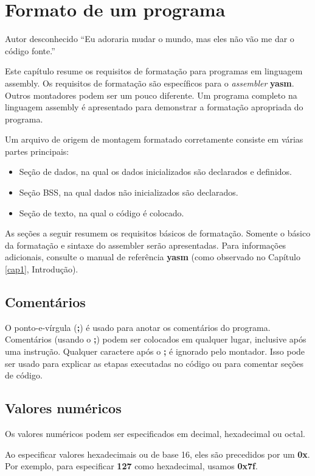 \chapter{Formato de um programa}
\label{cap4:formato}

\begin{chapquote}{Autor desconhecido}
``Eu adoraria mudar o mundo, mas eles não vão me dar o código fonte.''
\end{chapquote}
Este capítulo resume os requisitos de formatação para programas em linguagem assembly. Os requisitos de formatação são específicos para o  \textit{assembler} \textbf{yasm}. Outros montadores podem
ser um pouco diferente. Um programa completo na linguagem assembly é apresentado para demonstrar a formatação apropriada do programa.

Um arquivo de origem de montagem formatado corretamente consiste em várias partes principais:
\begin{itemize}
	\item Seção de dados, na qual os dados inicializados são declarados e definidos.
	\item Seção BSS, na qual dados não inicializados são declarados.
	\item Seção de texto, na qual o código é colocado.
\end{itemize}

As seções a seguir resumem os requisitos básicos de formatação. Somente o básico da formatação e sintaxe do assembler serão apresentadas. Para informações adicionais, consulte o
manual de referência \textbf{yasm} (como observado no Capítulo \ref{cap1}, Introdução).

\section{Comentários}
O ponto-e-vírgula (\textbf{;}) é usado para anotar os comentários do programa. Comentários (usando o \textbf{;}) podem ser
colocados em qualquer lugar, inclusive após uma instrução. Qualquer caractere após o \textbf{;} é ignorado pelo montador. Isso pode ser usado para explicar as etapas executadas no código ou para comentar
seções de código.

\section{Valores numéricos}
Os valores numéricos podem ser especificados em decimal, hexadecimal ou octal. 

Ao especificar valores hexadecimais ou de base 16, eles são precedidos por um \textbf{0x}. Por exemplo, para especificar \textbf{127} como hexadecimal, usamos \textbf{0x7f}.

